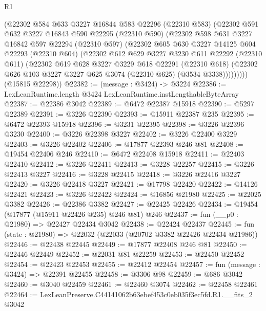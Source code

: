 \begin{lexlean}{R1}
\begin{coremodule}
        (@22302
          @584
          @633
          @3227
          @16844
          @583
          @22296
          (@22310 @583)
          (@22302
            @591
            @632
            @3227
            @16843
            @590
            @22295
            (@22310 @590)
            (@22302
              @598
              @631
              @3227
              @16842
              @597
              @22294
              (@22310 @597)
              (@22302
                @605
                @630
                @3227
                @14125
                @604
                @22293
                (@22310 @604)
                (@22302
                  @612
                  @629
                  @3227
                  @3230
                  @611
                  @22292
                  (@22310 @611)
                  (@22302
                    @619
                    @628
                    @3227
                    @3229
                    @618
                    @22291
                    (@22310 @618)
                    (@22302 @626 @103 @3227 @3227 @625 @3074 (@22310 @625) (@3534 @3338)))))))))
      (@15815 @22298))
@22382 := (message : @3424) -> @3224
@22386 := LexLeanRuntime.length @3424 LexLeanRuntime.instLengthableByteArray
@22387 := @22386 @3042
@22389 := @6472 @22387 @15918
@22390 := @5297 @22389
@22391 := @3226 @22390
@22393 := @15911 @22387 @235
@22395 := @6472 @22393 @15918
@22396 := @3231 @22395
@22398 := @3226 @22396 @3230
@22400 := @3226 @22398 @3227
@22402 := @3226 @22400 @3229
@22403 := @3226 @22402
@22406 := @17877 @22393 @246 @81
@22408 := @19454 @22406 @246
@22410 := @6472 @22408 @15918
@22411 := @22403 @22410
@22412 := @3226 @22411
@22413 := @3228 @22257
@22415 := @3226 @22413 @3227
@22416 := @3228 @22415
@22418 := @3226 @22416 @3227
@22420 := @3226 @22418 @3227
@22421 := @17798 @22420
@22422 := @14126 @22421
@22423 := @3226 @22422
@22424 := @16856 @21980
@22425 := @22025 @3382
@22426 := @22386 @3382
@22427 := @22425 @22426
@22434 := @19454 (@17877 (@15911 @22426 @235) @246 @81) @246
@22437 := fun (__p0 : @21980) => @22427 @22434 @3042
@22438 := @22424 @22437
@22445 := fun (state : @21980) => @22032 (@22033 (@20702 @3382 @22426 @22434 @21986))
@22446 := @22438 @22445
@22449 := @17877 @22408 @246 @81
@22450 := @22446 @22449
@22452 := @22031 @81 @22259
@22453 := @22450 @22452
@22454 := @22423 @22453
@22455 := @22412 @22454
@22457 := fun (message : @3424) => @22391 @22455
@22458 := @3306 @98
@22459 := @686 @3042
@22460 := @3040 @22459
@22461 := @22460 @3074
@22462 := @22458 @22461
@22464 := LexLeanPreserve.C44141062b63ebef453c0eb035f3ec5fd.R1.__fits_2 @3042

\end{coremodule}
\end{lexlean}
